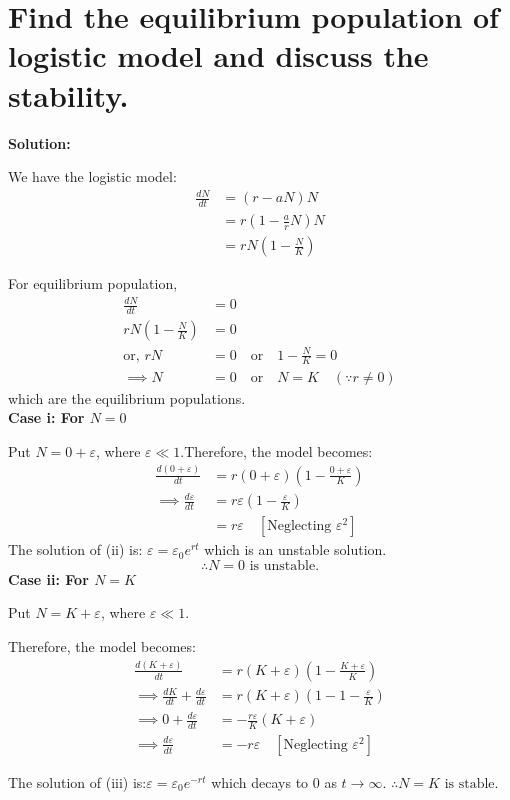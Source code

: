 \section{Find the equilibrium population of logistic model and discuss the stability.}
\textbf{Solution:}

We have the logistic model:
\begin{align*}
    \frac{dN}{dt} &= (r - aN)N \\
    &= r \left(1 - \frac{a}{r}N\right) N \\
    &= rN \left(1 - \frac{N}{K}\right) \tag{i}
\end{align*}

For equilibrium population,
\begin{align*}
    \frac{dN}{dt} &= 0\\
    rN \left(1 - \frac{N}{K}\right) &= 0\\
\text{or, } rN &= 0 \quad \text{or} \quad 1 - \frac{N}{K} = 0\\
\implies N &= 0 \quad \text{or} \quad N = K \quad (\because r \neq 0)
\end{align*}
which are the equilibrium populations.\\
\textbf{Case i: For $N = 0$}

Put $N = 0 + \varepsilon$, where $\varepsilon \ll 1$.Therefore, the model becomes:
\begin{align*}
    \frac{d(0 + \varepsilon)}{dt} &= r(0 + \varepsilon) \left(1 - \frac{0 + \varepsilon}{K}\right) \\
    \implies \frac{d\varepsilon}{dt} &= r\varepsilon \left(1 - \frac{\varepsilon}{K}\right) \\
    &= r\varepsilon \quad [\text{Neglecting } \varepsilon^2] \tag{ii}
\end{align*}
The solution of (ii) is:
   $ \varepsilon= \varepsilon_0 e^{rt}$
which is an unstable solution.
$$\therefore N = 0 \text{ is unstable.}$$
\textbf{Case ii: For $N = K$}

Put $N = K + \varepsilon$, where $\varepsilon \ll 1$.

Therefore, the model becomes:
\begin{align*}
    \frac{d(K + \varepsilon)}{dt} &= r(K + \varepsilon) \left(1 - \frac{K + \varepsilon}{K}\right) \\
    \implies \frac{dK}{dt} + \frac{d\varepsilon}{dt} &= r(K + \varepsilon) \left(1 - 1 - \frac{\varepsilon}{K}\right) \\
    \implies 0 + \frac{d\varepsilon}{dt} &= -\frac{r\varepsilon}{K} (K + \varepsilon) \\
    \implies \frac{d\varepsilon}{dt} &= -r\varepsilon \quad [\text{Neglecting } \varepsilon^2] \tag{iii}
\end{align*}

The solution of (iii) is:$\varepsilon = \varepsilon_0 e^{-rt}$
which decays to $0$ as $t \to \infty$.
$\therefore N = K \text{ is stable.}$